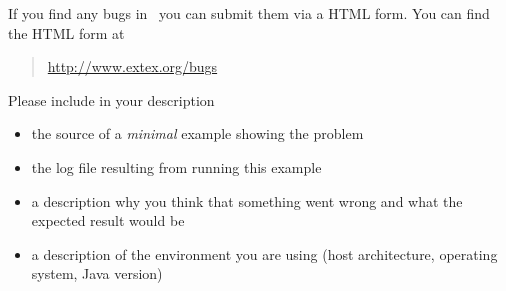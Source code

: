 If you find any bugs in \ExBib\ you can submit them 
via a HTML form.
You can find the HTML form at
\begin{quotation}
  \url{http://www.extex.org/bugs}
\end{quotation}

Please include in your description 
\begin{itemize}
\item the source of a \emph{minimal} example showing the problem
\item the log file resulting from running this example
\item a description why you think that something went wrong and what
  the expected result would be
\item a description of the environment you are using (host
  architecture, operating system, Java version)
\end{itemize}

\endinput
%
